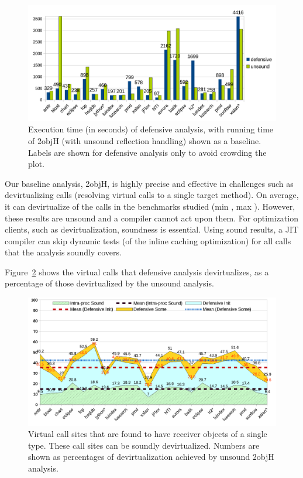 \begin{figure}[tbh]
\centering
\includegraphics[width=\linewidth]{assets/defensive/time.pdf}
\caption[Execution time of defensive analysis vs. unsound baseline]{Execution time (in seconds) of defensive analysis, with running time of 2objH (with unsound reflection handling) shown as a baseline. Labels are shown for defensive analysis only to avoid crowding the plot.}
\label{fig:sound:time}
\end{figure}


Our baseline analysis, 2objH, is highly precise and effective in challenges such as devirtualizing calls (resolving virtual calls to a single target method). On average, it can devirtualize  of the calls in the benchmarks studied (min , max ). However, these results are unsound and a compiler cannot act upon them. For optimization clients, such as devirtualization, soundness is essential. Using sound results, a JIT compiler can skip dynamic tests (of the inline caching optimization) for all calls that the analysis soundly covers.

Figure~\ref{fig:sound:devirt1} shows the virtual calls that defensive analysis devirtualizes, as a percentage of those devirtualized by the unsound analysis.

\begin{figure}[tbh]
\centering
\includegraphics[width=\linewidth]{assets/defensive/devirt1.pdf}
\caption[Virtual call sites found with a single typed receiver objects]{Virtual call sites that are found to have receiver objects of a single type. These call sites can be soundly devirtualized. Numbers are shown as percentages of devirtualization achieved by unsound 2objH analysis.}
\label{fig:sound:devirt1}
\end{figure}

